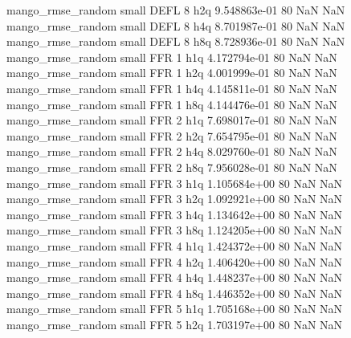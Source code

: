 mango_rmse_random      small     DEFL                 8                  h2q 9.548863e-01 80            NaN                NaN
mango_rmse_random      small     DEFL                 8                  h4q 8.701987e-01 80            NaN                NaN
mango_rmse_random      small     DEFL                 8                  h8q 8.728936e-01 80            NaN                NaN
mango_rmse_random      small      FFR                 1                  h1q 4.172794e-01 80            NaN                NaN
mango_rmse_random      small      FFR                 1                  h2q 4.001999e-01 80            NaN                NaN
mango_rmse_random      small      FFR                 1                  h4q 4.145811e-01 80            NaN                NaN
mango_rmse_random      small      FFR                 1                  h8q 4.144476e-01 80            NaN                NaN
mango_rmse_random      small      FFR                 2                  h1q 7.698017e-01 80            NaN                NaN
mango_rmse_random      small      FFR                 2                  h2q 7.654795e-01 80            NaN                NaN
mango_rmse_random      small      FFR                 2                  h4q 8.029760e-01 80            NaN                NaN
mango_rmse_random      small      FFR                 2                  h8q 7.956028e-01 80            NaN                NaN
mango_rmse_random      small      FFR                 3                  h1q 1.105684e+00 80            NaN                NaN
mango_rmse_random      small      FFR                 3                  h2q 1.092921e+00 80            NaN                NaN
mango_rmse_random      small      FFR                 3                  h4q 1.134642e+00 80            NaN                NaN
mango_rmse_random      small      FFR                 3                  h8q 1.124205e+00 80            NaN                NaN
mango_rmse_random      small      FFR                 4                  h1q 1.424372e+00 80            NaN                NaN
mango_rmse_random      small      FFR                 4                  h2q 1.406420e+00 80            NaN                NaN
mango_rmse_random      small      FFR                 4                  h4q 1.448237e+00 80            NaN                NaN
mango_rmse_random      small      FFR                 4                  h8q 1.446352e+00 80            NaN                NaN
mango_rmse_random      small      FFR                 5                  h1q 1.705168e+00 80            NaN                NaN
mango_rmse_random      small      FFR                 5                  h2q 1.703197e+00 80            NaN                NaN
